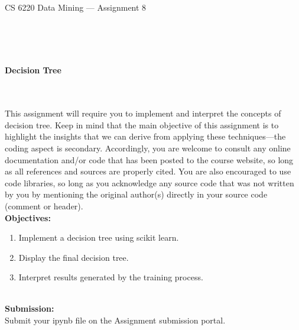 \documentclass[letter-paper,12pt]{article} %
\begin{document}

\begin{center}
\begin{Huge}
CS 6220 Data Mining --- Assignment 8
\end{Huge}
\end{center}

\hline
\hline
~\\~\\~\\

\begin{center}
\begin{Large}
\textbf{Decision Tree}
\end{Large}
\end{center}
~\\~\\

This assignment will require you to implement and interpret the concepts of decision tree. Keep in mind that the main objective of this assignment is to highlight the insights that we can derive from applying these techniques—the coding aspect is secondary. Accordingly, you are welcome to consult any online documentation and/or code that has been posted to the course website, so long as all references and sources are properly cited. You are also encouraged to use code libraries, so long as you acknowledge any source code that was not written by you by mentioning the original author(s) directly in your source code (comment or header).\\

\textbf{Objectives:}
\begin{enumerate}
    \item Implement a decision tree using scikit learn.
    \item Display the final decision tree.
    \item Interpret results generated by the training process. 
\end{enumerate}
~\\

\textbf{Submission:}\\

Submit your ipynb file on the Assignment submission portal. \\~\\
\end{document}
